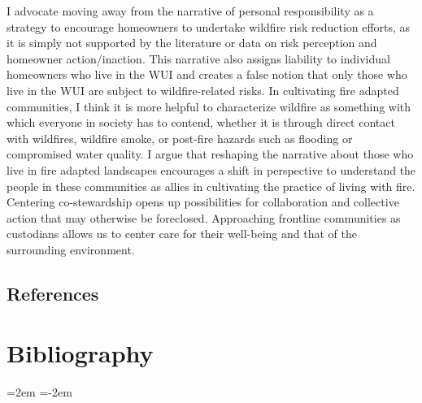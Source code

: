 \documentclass[
]{article}
\begin{document}
I advocate moving away from the narrative of personal responsibility as a strategy to encourage homeowners to undertake wildfire risk reduction efforts, as it is simply not supported by the literature or data on risk perception and homeowner action/inaction. This narrative also assigns liability to individual homeowners who live in the WUI and creates a false notion that only those who live in the WUI are subject to wildfire-related risks. In cultivating fire adapted communities, I think it is more helpful to characterize wildfire as something with which everyone in society has to contend, whether it is through direct contact with wildfires, wildfire smoke, or post-fire hazards such as flooding or compromised water quality. I argue that reshaping the narrative about those who live in fire adapted landscapes encourages a shift in perspective to understand the people in these communities as allies in cultivating the practice of living with fire. Centering co-stewardship opens up possibilities for collaboration and collective action that may otherwise be foreclosed. Approaching frontline communities as custodians allows us to center care for their well-being and that of the surrounding environment.

\subsection{References}\label{references-2}

\section*{Bibliography}

\noindent
\leftskip=2em
\parindent=-2em
\end{document}
